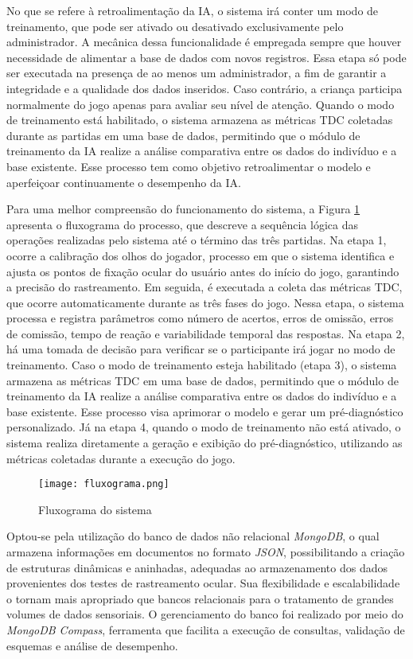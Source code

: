 No que se refere à retroalimentação da IA, o sistema irá conter um modo de treinamento, que pode ser ativado ou desativado exclusivamente pelo administrador. A mecânica dessa funcionalidade é empregada sempre que houver necessidade de alimentar a base de dados com novos registros. Essa etapa só pode ser executada na presença de ao menos um administrador, a fim de garantir a integridade e a qualidade dos dados inseridos. Caso contrário, a criança participa normalmente do jogo apenas para avaliar seu nível de atenção. Quando o modo de treinamento está habilitado, o sistema armazena as métricas TDC coletadas durante as partidas em uma base de dados, permitindo que o módulo de treinamento da IA realize a análise comparativa entre os dados do indivíduo e a base existente. Esse processo tem como objetivo retroalimentar o modelo e aperfeiçoar continuamente o desempenho da IA. 

Para uma melhor compreensão do funcionamento do sistema, a Figura \ref{fig:fluxograma} apresenta o fluxograma do processo, que descreve a sequência lógica das operações realizadas pelo sistema até o término das três partidas. Na etapa 1, ocorre a calibração dos olhos do jogador, processo em que o sistema identifica e ajusta os pontos de fixação ocular do usuário antes do início do jogo, garantindo a precisão do rastreamento. Em seguida, é executada a coleta das métricas TDC, que ocorre automaticamente durante as três fases do jogo. Nessa etapa, o sistema processa e registra parâmetros como número de acertos, erros de omissão, erros de comissão, tempo de reação e variabilidade temporal das respostas. Na etapa 2, há uma tomada de decisão para verificar se o participante irá jogar no modo de treinamento. Caso o modo de treinamento esteja habilitado (etapa 3), o sistema armazena as métricas TDC em uma base de dados, permitindo que o módulo de treinamento da IA realize a análise comparativa entre os dados do indivíduo e a base existente. Esse processo visa aprimorar o modelo e gerar um pré-diagnóstico personalizado. Já na etapa 4, quando o modo de treinamento não está ativado, o sistema realiza diretamente a geração e exibição do pré-diagnóstico, utilizando as métricas coletadas durante a execução do jogo.

\begin{figure}[H]
    \centering
    \caption{Fluxograma do sistema}%
    \label{fig:fluxograma}
    \texttt{[image: fluxograma.png]}%
\end{figure}

Optou-se pela utilização do banco de dados não relacional \textit{MongoDB}, o qual armazena informações em documentos no formato \textit{JSON}, possibilitando a criação de estruturas dinâmicas e aninhadas, adequadas ao armazenamento dos dados provenientes dos testes de rastreamento ocular. Sua flexibilidade e escalabilidade o tornam mais apropriado que bancos relacionais para o tratamento de grandes volumes de dados sensoriais. O gerenciamento do banco foi realizado por meio do \textit{MongoDB Compass}, ferramenta que facilita a execução de consultas, validação de esquemas e análise de desempenho.
